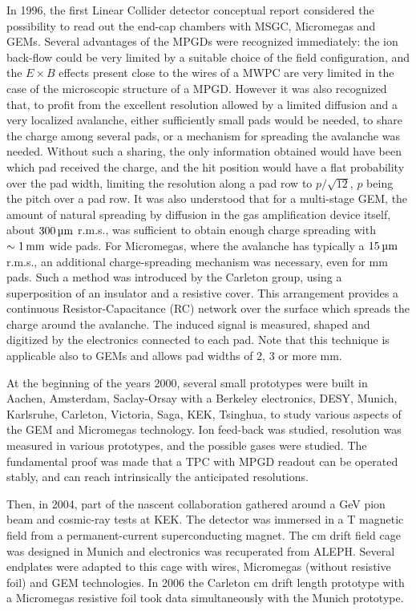 In 1996, the first Linear Collider detector conceptual report \cite{Settles:1997wj} considered the possibility to read out the end-cap chambers with MSGC, Micromegas and GEMs. Several advantages of the MPGDs were recognized immediately: the ion back-flow could be very limited by a suitable choice of the field configuration, and the $E \times B$ effects present close to the wires of a MWPC are very limited in the case of the microscopic structure of a MPGD. However it was also recognized that, to profit from the
excellent resolution allowed by a limited diffusion and a very localized avalanche, either sufficiently small pads would be needed, to share the charge among several pads, or a mechanism for spreading the avalanche was needed. Without such a sharing, the only information obtained would have been which pad received the charge, and the hit position would have a flat probability over the pad width, limiting the resolution along a pad row to $p/\sqrt{12}$, $p$ being the pitch over a pad row. It was also
understood that for a multi-stage GEM, the amount of natural spreading by diffusion in the gas amplification device itself, about $\unit[300]{\micro m}$ r.m.s., was sufficient to obtain enough charge spreading with $\sim\unit[1]{mm}$ wide pads. For Micromegas, where the avalanche has typically a $\unit[15]{\micro m}$ r.m.s., an
additional charge-spreading mechanism was necessary, even for \unit[1]{mm} pads. Such a method was introduced by the Carleton group, using a superposition of an insulator and a resistive cover. This arrangement provides a continuous Resistor-Capacitance (RC) network over the surface which spreads the charge around the avalanche. The induced
signal is measured, shaped and digitized by the electronics connected to each pad. Note that this technique is applicable also to GEMs and allows pad widths of 2, 3 or more mm.

At the beginning of the years 2000, several small prototypes were built in Aachen, Amsterdam, Saclay-Orsay with a Berkeley electronics, DESY, Munich, Karlsruhe, Carleton, Victoria, Saga, KEK, Tsinghua, to study various aspects of the GEM and Micromegas technology. Ion feed-back was studied, resolution was measured in various prototypes, and the possible gases were studied. The fundamental proof was made that a TPC with MPGD readout can be operated stably, and can reach intrinsically the anticipated resolutions.

Then, in 2004, part of the nascent collaboration gathered around a \unit[5]{GeV} pion beam and cosmic-ray tests at KEK. The detector was immersed in a \unit[1]{T} magnetic field from a permanent-current superconducting magnet. The \unit[25]{cm} drift field cage was designed in Munich and electronics was recuperated from ALEPH. Several endplates were adapted to this cage with wires, Micromegas (without resistive foil) and GEM technologies. In 2006 the Carleton \unit[16]{cm} drift length prototype with a Micromegas resistive foil took data simultaneously with the Munich prototype.

